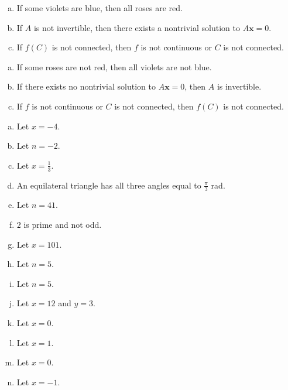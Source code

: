\documentclass[12pt]{scrartcl} %
\begin{document}
\begin{enumerate}[(a)]
	\item If some violets are blue, then all roses are red.
	\item If $A$ is not invertible, then there exists a nontrivial solution to $A\mathbf{x} = 0$.
	\item If $f(C)$ is not connected, then $f$ is not continuous or $C$ is not connected.
\end{enumerate}

\begin{enumerate}[(a)]
	\item If some roses are not red, then all violets are not blue.
	\item If there exists no nontrivial solution to $A\mathbf{x} = 0$, then $A$ is invertible.
	\item If $f$ is not continuous or $C$ is not connected, then $f(C)$ is not connected.
\end{enumerate}

\begin{enumerate}[(a)]
	\item Let $x = -4$.
	\item Let $n = -2$.
	\item Let $x = \frac{1}{3}$.
	\item An equilateral triangle has all three angles equal to $\frac{\pi}{3}$ rad.
	\item Let $n = 41$.
	\item $2$ is prime and not odd.
	\item Let $x = 101$.
	\item Let $n = 5$.
	\item Let $n = 5$.
	\item Let $x = 12$ and $y = 3$.
	\item Let $x = 0$.
	\item Let $x = 1$.
	\item Let $x = 0$.
	\item Let $x = -1$.
\end{enumerate}
\end{document}
